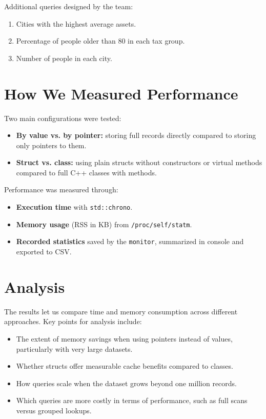 \documentclass[11pt,letterpaper,oneside]{article}
\begin{document}
Additional queries designed by the team:
\begin{enumerate}
    \item Cities with the highest average assets.
    \item Percentage of people older than 80 in each tax group.
    \item Number of people in each city.
\end{enumerate}

\section{How We Measured Performance}

Two main configurations were tested:
\begin{itemize}
    \item \textbf{By value vs. by pointer:} storing full records directly
    compared to storing only pointers to them.
    \item \textbf{Struct vs. class:} using plain structs without constructors or
    virtual methods compared to full C++ classes with methods.
\end{itemize}

Performance was measured through:
\begin{itemize}
    \item \textbf{Execution time} with \texttt{std::chrono}.
    \item \textbf{Memory usage} (RSS in KB) from \texttt{/proc/self/statm}.
    \item \textbf{Recorded statistics} saved by the \texttt{monitor}, summarized
    in console and exported to CSV.
\end{itemize}

\section{Analysis}

The results let us compare time and memory consumption across different
approaches. Key points for analysis include:
\begin{itemize}
    \item The extent of memory savings when using pointers instead of values,
    particularly with very large datasets.
    \item Whether structs offer measurable cache benefits compared to classes.
    \item How queries scale when the dataset grows beyond one million records.
    \item Which queries are more costly in terms of performance, such as full
    scans versus grouped lookups.
\end{itemize}
\end{document}
